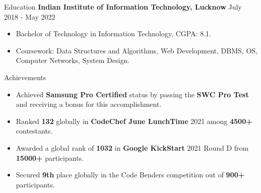 \documentclass{resume}
\begin{document}
\begin{rSection}{Education}
    {\bf Indian Institute of Information Technology, Lucknow} \hfill {July 2018 - May 2022} \\
    \vspace{-1pt}
    \begin{itemize}
        \itemsep -3pt {}
        \item Bachelor of Technology in Information Technology, CGPA: 8.1.
        \item Coursework: Data Structures and Algorithms, Web Development, DBMS, OS, Computer Networks, System Design.
    \end{itemize}
\end{rSection}

\vspace{-5pt}
\begin{rSection}{Achievements}
    \begin{itemize}
        \itemsep 1pt {}
        \vspace{3pt}
            \item Achieved \textbf{Samsung Pro Certified} status by passing the \textbf{SWC Pro Test} and receiving a bonus for this accomplishment.
            \item Ranked \textbf{132} globally in \textbf{CodeChef June LunchTime} 2021 among \textbf{4500+} contestants.
            \vspace{-3pt} %
            \item Awarded a global rank of \textbf{1032} in \textbf{Google KickStart} 2021 Round D from \textbf{15000+} participants.
            \vspace{-3pt} %
            \item Secured \textbf{9th} place globally in the Code Benders competition out of \textbf{900+} participants.
        \vspace{-3pt} %
    \end{itemize}
\end{rSection}
\end{document}
